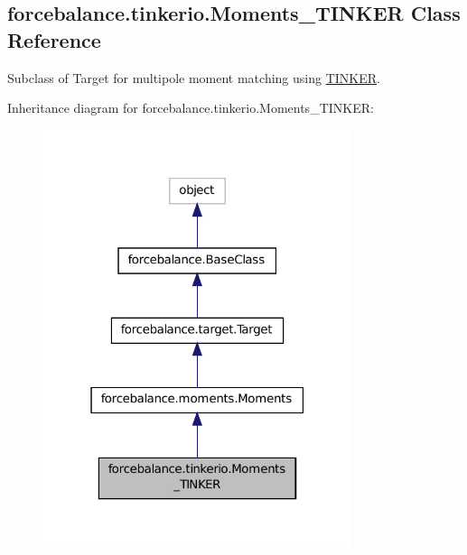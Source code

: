 \hypertarget{classforcebalance_1_1tinkerio_1_1Moments__TINKER}{\subsection{forcebalance.\-tinkerio.\-Moments\-\_\-\-T\-I\-N\-K\-E\-R Class Reference}
\label{classforcebalance_1_1tinkerio_1_1Moments__TINKER}
}


Subclass of Target for multipole moment matching using \hyperlink{classforcebalance_1_1tinkerio_1_1TINKER}{T\-I\-N\-K\-E\-R}.  




Inheritance diagram for forcebalance.\-tinkerio.\-Moments\-\_\-\-T\-I\-N\-K\-E\-R\-:
\nopagebreak
\begin{figure}[H]
\begin{center}
\leavevmode
\includegraphics[width=256pt]{classforcebalance_1_1tinkerio_1_1Moments__TINKER__inherit__graph}
\end{center}
\end{figure}


